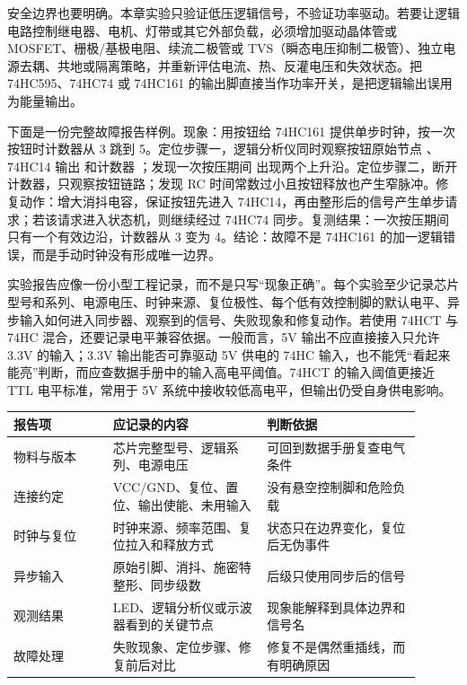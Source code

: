 安全边界也要明确。本章实验只验证低压逻辑信号，不验证功率驱动。若要让逻辑电路控制继电器、电机、灯带或其它外部负载，必须增加驱动晶体管或 MOSFET、栅极/基极电阻、续流二极管或 TVS（瞬态电压抑制二极管）、独立电源去耦、共地或隔离策略，并重新评估电流、热、反灌电压和失效状态。把 74HC595、74HC74 或 74HC161 的输出脚直接当作功率开关，是把逻辑输出误用为能量输出。

下面是一份完整故障报告样例。现象：用按钮给 74HC161 提供单步时钟，按一次按钮时计数器从 3 跳到 5。定位步骤一，逻辑分析仪同时观察按钮原始节点 、74HC14 输出  和计数器 ；发现一次按压期间  出现两个上升沿。定位步骤二，断开计数器，只观察按钮链路；发现 RC 时间常数过小且按钮释放也产生窄脉冲。修复动作：增大消抖电容，保证按钮先进入 74HC14，再由整形后的信号产生单步请求；若该请求进入状态机，则继续经过 74HC74 同步。复测结果：一次按压期间  只有一个有效边沿，计数器从 3 变为 4。结论：故障不是 74HC161 的加一逻辑错误，而是手动时钟没有形成唯一边界。

实验报告应像一份小型工程记录，而不是只写“现象正确”。每个实验至少记录芯片型号和系列、电源电压、时钟来源、复位极性、每个低有效控制脚的默认电平、异步输入如何进入同步器、观察到的信号、失败现象和修复动作。若使用 74HCT 与 74HC 混合，还要记录电平兼容依据。一般而言，5V 输出不应直接接入只允许 3.3V 的输入；3.3V 输出能否可靠驱动 5V 供电的 74HC 输入，也不能凭“看起来能亮”判断，而应查数据手册中的输入高电平阈值。74HCT 的输入阈值更接近 TTL 电平标准，常用于 5V 系统中接收较低高电平，但输出仍受自身供电影响。

\begin{longtable}{L{0.22\linewidth}L{0.34\linewidth}L{0.34\linewidth}}
\toprule
报告项 & 应记录的内容 & 判断依据 \\
\midrule
物料与版本 & 芯片完整型号、逻辑系列、电源电压 & 可回到数据手册复查电气条件 \\\tablerowrule
连接约定 & VCC/GND、复位、置位、输出使能、未用输入 & 没有悬空控制脚和危险负载 \\\tablerowrule
时钟与复位 & 时钟来源、频率范围、复位拉入和释放方式 & 状态只在边界变化，复位后无伪事件 \\\tablerowrule
异步输入 & 原始引脚、消抖、施密特整形、同步级数 & 后级只使用同步后的信号 \\\tablerowrule
观测结果 & LED、逻辑分析仪或示波器看到的关键节点 & 现象能解释到具体边界和信号名 \\\tablerowrule
故障处理 & 失败现象、定位步骤、修复前后对比 & 修复不是偶然重插线，而有明确原因 \\
\bottomrule
\end{longtable}

